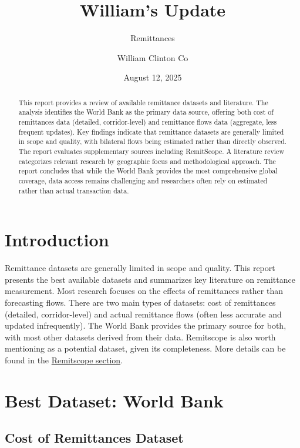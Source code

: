 \documentclass[
  11pt,
]{article}
\title{William's Update}
\subtitle{Remittances}
\author{William Clinton Co}
\date{August 12, 2025}
\renewcommand*\contentsname{Table of contents}
\newcommand\contentsname{Table of contents}
\begin{document}
\maketitle
\begin{abstract}
This report provides a review of available remittance datasets and
literature. The analysis identifies the World Bank as the primary data
source, offering both cost of remittances data (detailed,
corridor-level) and remittance flows data (aggregate, less frequent
updates). Key findings indicate that remittance datasets are generally
limited in scope and quality, with bilateral flows being estimated
rather than directly observed. The report evaluates supplementary
sources including RemitScope. A literature review categorizes relevant
research by geographic focus and methodological approach. The report
concludes that while the World Bank provides the most comprehensive
global coverage, data access remains challenging and researchers often
rely on estimated rather than actual transaction data.
\end{abstract}

\renewcommand*\contentsname{Table of contents}
{
\hypersetup{linkcolor=}
\setcounter{tocdepth}{10}
\tableofcontents
}

\section{Introduction}\label{introduction}

Remittance datasets are generally limited in scope and quality. This
report presents the best available datasets and summarizes key
literature on remittance measurement. Most research focuses on the
effects of remittances rather than forecasting flows. There are two main
types of datasets: cost of remittances (detailed, corridor-level) and
actual remittance flows (often less accurate and updated infrequently).
The World Bank provides the primary source for both, with most other
datasets derived from their data. Remitscope is also worth mentioning as
a potential dataset, given its completeness. More details can be found
in the \hyperref[remitscope]{Remitscope section}.

\section{Best Dataset: World Bank}\label{best-dataset-world-bank}

\subsection{Cost of Remittances
Dataset}\label{cost-of-remittances-dataset}
\end{document}
